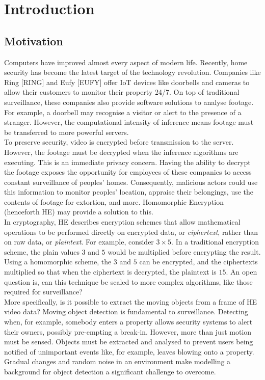 \chapter{Introduction}
\label{chap:introduction}

\section{Motivation}
\label{sec:motivation}
\setlength{\leftskip}{0.25cm}
\indent \indent
Computers have improved almost every aspect of modern life. Recently, home security has become the latest target of the technology revolution. Companies like Ring [RING] and Eufy [EUFY] offer IoT devices like doorbells and cameras to allow their customers to monitor their property 24/7. On top of traditional surveillance, these companies also provide software solutions to analyse footage. For example, a doorbell may recognise a visitor or alert to the presence of a stranger. However, the computational intensity of inference means footage must be transferred to more powerful servers.
\smallskip \\ \indent
To preserve security, video is encrypted before transmission to the server. However, the footage must be decrypted when the inference algorithms are executing. This is an immediate privacy concern. Having the ability to decrypt the footage exposes the opportunity for employees of these companies to access constant surveillance of peoples' homes. Consequently, malicious actors could use this information to monitor peoples' location, appraise their belongings, use the contents of footage for extortion, and more. Homomorphic Encryption (henceforth HE) may provide a solution to this.
\smallskip \\ \indent
In cryptography, HE describes encryption schemes that allow mathematical operations to be performed directly on encrypted data, or \textit{ciphertext}, rather than on raw data, or \textit{plaintext}. For example, consider $3 \times 5$. In a traditional encryption scheme, the plain values $3$ and $5$ would be multiplied before encrypting the result. Using a homomorphic scheme, the $3$ and $5$ can be encrypted, and the ciphertexts multiplied so that when the ciphertext is decrypted, the plaintext is $15$. An open question is, can this technique be scaled to more complex algorithms, like those required for surveillance?
\smallskip \\ \indent
More specifically, is it possible to extract the moving objects from a frame of HE video data? Moving object detection is fundamental to surveillance. Detecting when, for example, somebody enters a property allows security systems to alert their owners, possibly pre-empting a break-in. However, more than just motion must be sensed. Objects must be extracted and analysed to prevent users being notified of unimportant events like, for example, leaves blowing onto a property. Gradual changes and random noise in an environment make modelling a background for object detection a significant challenge to overcome.

